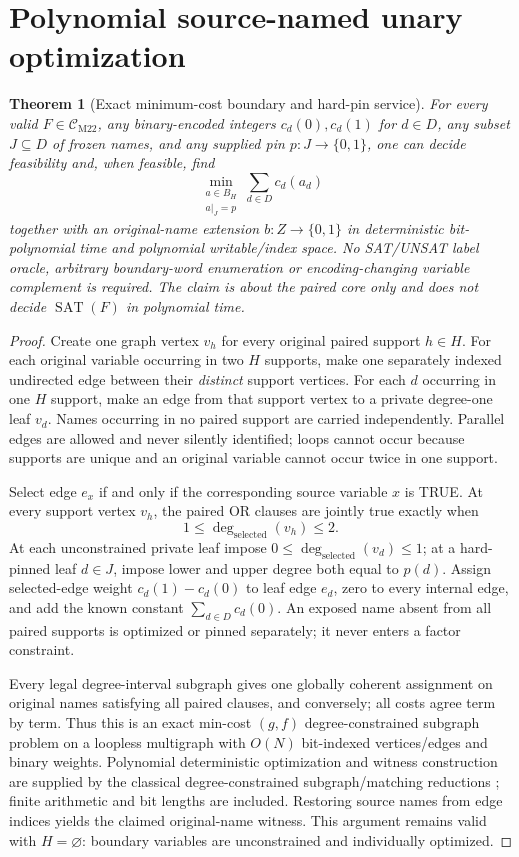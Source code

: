 \documentclass[11pt]{article}
\newtheorem{theorem}{Theorem}
\newcommand{\CM}{\mathcal C_{\mathrm{M22}}}
\newcommand{\SAT}{\operatorname{SAT}}
\begin{document}
\section{Polynomial source-named unary optimization}
\begin{theorem}[Exact minimum-cost boundary and hard-pin service]
For every valid $F\in\CM$, any binary-encoded integers $c_d(0),c_d(1)$ for $d\in D$, any subset $J\subseteq D$ of frozen names, and any supplied pin $p:J\to\{0,1\}$, one can decide feasibility and, when feasible, find
\[
 \min_{\substack{a\in B_H\\a|_J=p}}\sum_{d\in D}c_d(a_d)
\]
together with an original-name extension $b:Z\to\{0,1\}$ in deterministic bit-polynomial time and polynomial writable/index space. No SAT/UNSAT label oracle, arbitrary boundary-word enumeration or encoding-changing variable complement is required. The claim is about the paired core only and does not decide $\SAT(F)$ in polynomial time.
\end{theorem}
\begin{proof}
Create one graph vertex $v_h$ for every original paired support $h\in H$. For each original variable occurring in two $H$ supports, make one separately indexed undirected edge between their \emph{distinct} support vertices. For each $d$ occurring in one $H$ support, make an edge from that support vertex to a private degree-one leaf $v_d$. Names occurring in no paired support are carried independently. Parallel edges are allowed and never silently identified; loops cannot occur because supports are unique and an original variable cannot occur twice in one support.

Select edge $e_x$ if and only if the corresponding source variable $x$ is TRUE. At every support vertex $v_h$, the paired OR clauses are jointly true exactly when
\[
  1\le\deg_{\mathrm{selected}}(v_h)\le2.
\]
At each unconstrained private leaf impose $0\le\deg_{\mathrm{selected}}(v_d)\le1$; at a hard-pinned leaf $d\in J$, impose lower and upper degree both equal to $p(d)$. Assign selected-edge weight $c_d(1)-c_d(0)$ to leaf edge $e_d$, zero to every internal edge, and add the known constant $\sum_{d\in D}c_d(0)$. An exposed name absent from all paired supports is optimized or pinned separately; it never enters a factor constraint.

Every legal degree-interval subgraph gives one globally coherent assignment on original names satisfying all paired clauses, and conversely; all costs agree term by term. Thus this is an exact min-cost $(g,f)$ degree-constrained subgraph problem on a loopless multigraph with $O(N)$ bit-indexed vertices/edges and binary weights. Polynomial deterministic optimization and witness construction are supplied by the classical degree-constrained subgraph/matching reductions \cite{gabow83,gabow18}; finite arithmetic and bit lengths are included. Restoring source names from edge indices yields the claimed original-name witness. This argument remains valid with $H=\varnothing$: boundary variables are unconstrained and individually optimized.
\end{proof}
\end{document}
